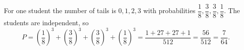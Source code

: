 For one student the number of tails is $0,1,2,3$ with probabilities $\dfrac{1}{8},\dfrac{3}{8},\dfrac{3}{8},\dfrac{1}{8}$. The students are independent, so
\[
P=\left(\dfrac{1}{8}\right)^3+\left(\dfrac{3}{8}\right)^3+\left(\dfrac{3}{8}\right)^3+\left(\dfrac{1}{8}\right)^3=\dfrac{1+27+27+1}{512}=\dfrac{56}{512}=\boxed{\dfrac{7}{64}}.
\]
